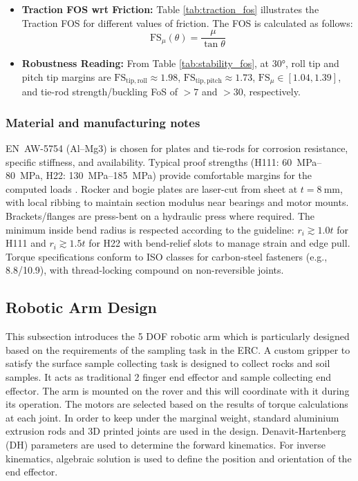\documentclass[letterpaper, 10 pt, conference]{ieeeconf}  %
\begin{document}
\begin{itemize}
\item \textbf{Traction FOS wrt Friction:}
Table \ref{tab:traction_fos} illustrates the Traction FOS for different values of friction. The FOS is calculated as follows:
\begin{equation}
\mathrm{FS}_{\mu}(\theta) = \frac{\mu}{\tan\theta}
\label{eq:FS_mu}
\end{equation}


\item \textbf{Robustness Reading:}
From Table \ref{tab:stability_fos}, at \ang{30}, roll tip and pitch tip margins are \(\mathrm{FS}_{\mathrm{tip,roll}}\!\approx\!1.98\), \(\mathrm{FS}_{\mathrm{tip,pitch}}\!\approx\!1.73\), \(\mathrm{FS}_\mu\!\in[1.04,1.39]\), and tie-rod strength/buckling FoS of \(>\!7\) and \(>\!30\), respectively.
\end{itemize}
\subsubsection{Material and manufacturing notes}
EN~AW-5754 (Al--Mg3) is chosen for plates and tie-rods for corrosion resistance, specific stiffness, and availability. Typical proof strengths (H111: \SIrange{60}{80}{\mega\pascal}, H22: \SIrange{130}{185}{\mega\pascal}) provide comfortable margins for the computed loads \cite{tk5754,rb5754h111,tk5754h22}. Rocker and bogie plates are laser-cut from sheet at \(t=\SI{8}{\milli\meter}\), with local ribbing to maintain section modulus near bearings and motor mounts. Brackets/flanges are press-bent on a hydraulic press where required. The minimum inside bend radius is respected according to the guideline: \(r_i\!\gtrsim\!1.0t\) for H111 and \(r_i\!\gtrsim\!1.5t\) for H22 with bend-relief slots to manage strain and edge pull. Torque specifications conform to ISO classes for carbon-steel fasteners (e.g., 8.8/10.9), with thread-locking compound on non-reversible joints.


\subsection{Robotic Arm Design}
This subsection introduces the 5 DOF robotic arm which is particularly designed based on the requirements of the sampling task in the ERC. A custom gripper to satisfy the surface sample collecting task is designed to collect rocks and soil samples. It acts as traditional 2 finger end effector and sample collecting end effector. The arm is mounted on the rover and this will coordinate with it during its operation. The motors are selected based on the results of torque calculations at each joint. In order to keep under the marginal weight, standard aluminium extrusion rods and 3D printed joints are used in the design. Denavit-Hartenberg (DH) parameters are used to determine the forward kinematics. For inverse kinematics, algebraic solution is used to define the position and orientation of the end effector.
\end{document}
